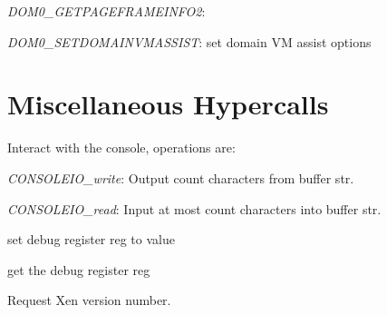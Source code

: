 \documentclass[11pt,twoside,final,openright]{xenstyle}
\begin{document}
{\it DOM0\_GETPAGEFRAMEINFO2}:

{\it DOM0\_SETDOMAINVMASSIST}: set domain VM assist options




\section{Miscellaneous Hypercalls} 



Interact with the console, operations are:

{\it CONSOLEIO\_write}: Output count characters from buffer str.

{\it CONSOLEIO\_read}: Input at most count characters into buffer str.




set debug register reg to value



 get the debug register reg



Request Xen version number.






\end{document}
